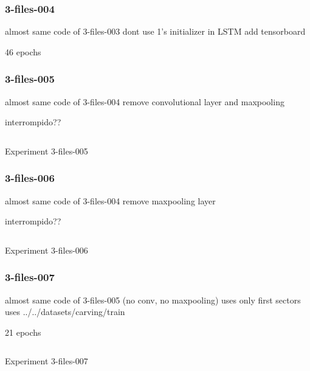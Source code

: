 \subsubsection{3-files-004}

almost same code of 3-files-003
dont use 1's initializer in LSTM
add tensorboard

46 epochs

\subsubsection{3-files-005}

almost same code of 3-files-004
remove convolutional layer and maxpooling

interrompido??

\noindent
\begin{algorithm}
\begin{lstlisting}[language=Python, frame=single, numbers=left]
\end{lstlisting}
\caption{\label{alg:3-files-005}Experiment 3-files-005}
\end{algorithm}

\subsubsection{3-files-006}

almost same code of 3-files-004
remove maxpooling layer

interrompido??

\noindent
\begin{algorithm}
\begin{lstlisting}[language=Python, frame=single, numbers=left]
\end{lstlisting}
\caption{\label{alg:3-files-006}Experiment 3-files-006}
\end{algorithm}

\subsubsection{3-files-007}

almost same code of 3-files-005 (no conv, no maxpooling)
uses only first sectors
uses ../../datasets/carving/train

21 epochs

\noindent
\begin{algorithm}
\begin{lstlisting}[language=Python, frame=single, numbers=left]
\end{lstlisting}
\caption{\label{alg:3-files-007}Experiment 3-files-007}
\end{algorithm}

